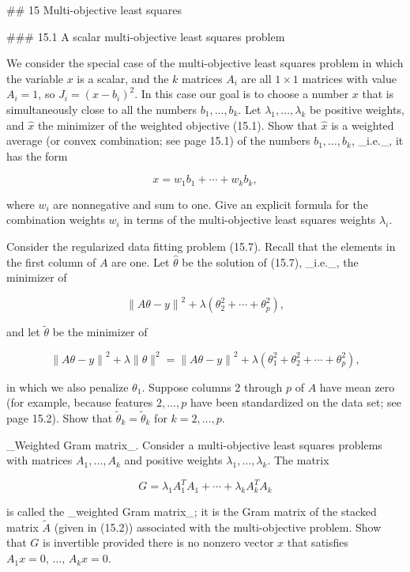 

## 15 Multi-objective least squares

### 15.1 A scalar multi-objective least squares problem

We consider the special case of the multi-objective least squares problem in which the variable \(x\) is a scalar, and the \(k\) matrices \(A_{i}\) are all \(1\times 1\) matrices with value \(A_{i}=1\), so \(J_{i}=(x-b_{i})^{2}\). In this case our goal is to choose a number \(x\) that is simultaneously close to all the numbers \(b_{1},\ldots,b_{k}\). Let \(\lambda_{1},\ldots,\lambda_{k}\) be positive weights, and \(\hat{x}\) the minimizer of the weighted objective (15.1). Show that \(\hat{x}\) is a weighted average (or convex combination; see page 15.1) of the numbers \(b_{1},\ldots,b_{k}\), _i.e._, it has the form

\[x=w_{1}b_{1}+\cdots+w_{k}b_{k},\]

where \(w_{i}\) are nonnegative and sum to one. Give an explicit formula for the combination weights \(w_{i}\) in terms of the multi-objective least squares weights \(\lambda_{i}\).

Consider the regularized data fitting problem (15.7). Recall that the elements in the first column of \(A\) are one. Let \(\hat{\theta}\) be the solution of (15.7), _i.e._, the minimizer of

\[\left\|A\theta-y\right\|^{2}+\lambda(\theta_{2}^{2}+\cdots+\theta_{p}^{2}),\]

and let \(\tilde{\theta}\) be the minimizer of

\[\left\|A\theta-y\right\|^{2}+\lambda\|\theta\|^{2}=\left\|A\theta-y\right\|^{ 2}+\lambda(\theta_{1}^{2}+\theta_{2}^{2}+\cdots+\theta_{p}^{2}),\]

in which we also penalize \(\theta_{1}\). Suppose columns 2 through \(p\) of \(A\) have mean zero (for example, because features \(2,\ldots,p\) have been standardized on the data set; see page 15.2). Show that \(\tilde{\theta}_{k}=\tilde{\theta}_{k}\) for \(k=2,\ldots,p\).

_Weighted Gram matrix_. Consider a multi-objective least squares problems with matrices \(A_{1},\ldots,A_{k}\) and positive weights \(\lambda_{1},\ldots,\lambda_{k}\). The matrix

\[G=\lambda_{1}A_{1}^{T}A_{1}+\cdots+\lambda_{k}A_{k}^{T}A_{k}\]

is called the _weighted Gram matrix_; it is the Gram matrix of the stacked matrix \(\tilde{A}\) (given in (15.2)) associated with the multi-objective problem. Show that \(G\) is invertible provided there is no nonzero vector \(x\) that satisfies \(A_{1}x=0,\,\ldots,\,A_{k}x=0\).

